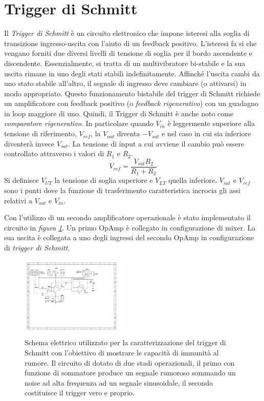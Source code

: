 \documentclass[journal]{IEEEtran}
\begin{document}
\section{Trigger di Schmitt} 

Il \textit{Trigger di Schmitt} è un circuito elettronico che impone isteresi alla soglia di transizione ingresso-uscita con l'aiuto di un feedback positivo. L'isteresi fa si che vengano forniti due diversi livelli di tensione di soglia per il bordo ascendente e discendente. Essenzialmente, si tratta di un multivibratore bi-stabile e la sua uscita rimane in uno degli stati stabili indefinitamente. Affinché l'uscita cambi da uno stato stabile all'altro, il segnale di ingresso deve cambiare (o attivarsi) in modo appropriato. Questo funzionamento bistabile del trigger di Schmitt richiede un amplificatore con feedback positivo (o \textit{feedback rigenerativo}) con un guadagno in loop maggiore di uno. Quindi, il Trigger di Schmitt è anche noto come \textit{comparatore rigenerativo}.
In particolare quando $V_{in}$ è leggermente superiore alla tensione di riferimento, $V_{ref}$, la $V_{out}$ diventa $-V_{sat}$ e nel caso in cui sia inferiore diventerà invece $V_{sat}$. La tensione di input a cui avviene il cambio può essere controllato attraverso i valori di $R_1$ e $R_2$.
\[V_{ref} = \frac{V_{sat}R_2}{R_1+R_2}\]
Si definisce $V_{UT}$ la tensione di soglia superiore e $V_{LT}$ quella inferiore. $V_{sat}$ e $V_{ref}$ sono i punti dove la funzione di trasferimento caratteristica incrocia gli assi relativi a $V_{out}$ e $V_{in}$.

Con l'utilizzo di un secondo amplificatore operazionale è stato implementato il circuito in \textit{figura \ref{fig:schmitt-trigger}}. Un primo OpAmp è collegato in configurazione di mixer. La sua uscita è collegata a uno degli ingressi del secondo OpAmp in configurazione di \textit{trigger di Schmitt}. 

\begin{figure}[H]%
\begin{center}
\includegraphics[width=0.45\textwidth]{sch-simulations/output/OPA-mixer-trigger.pdf}
\caption{Schema elettrico utilizzato per la caratterizzazione del trigger di Schmitt con l'obiettivo di mostrare le capacità di immunità al rumore. Il circuito di dotato di due stadi operazionali, il primo con funzione di sommatore produce un segnale rumoroso sommando un noise ad alta frequenza ad un segnale sinusoidale, il secondo costituisce il trigger vero e proprio.} %
\label{fig:schmitt-trigger}
\end{center}
\end{figure}
\end{document}
